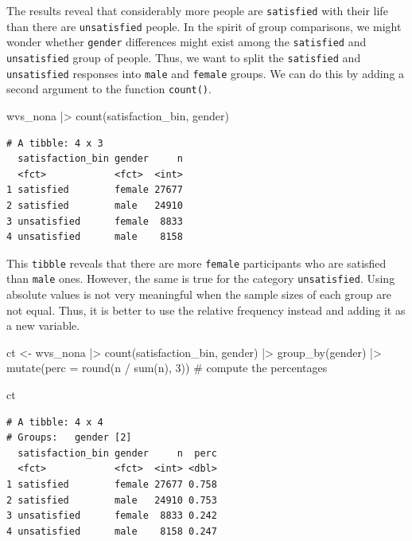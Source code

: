 \documentclass[
  letterpaper,
]{krantz}
\makeatletter
\newenvironment{Shaded}{\begin{snugshade}}{\end{snugshade}}
\newcommand{\AttributeTok}[1]{\textcolor[rgb]{0.40,0.45,0.13}{#1}}
\newcommand{\CommentTok}[1]{\textcolor[rgb]{0.37,0.37,0.37}{#1}}
\newcommand{\DecValTok}[1]{\textcolor[rgb]{0.68,0.00,0.00}{#1}}
\newcommand{\FunctionTok}[1]{\textcolor[rgb]{0.28,0.35,0.67}{#1}}
\newcommand{\NormalTok}[1]{\textcolor[rgb]{0.00,0.23,0.31}{#1}}
\newcommand{\OtherTok}[1]{\textcolor[rgb]{0.00,0.23,0.31}{#1}}
\newcommand{\SpecialCharTok}[1]{\textcolor[rgb]{0.37,0.37,0.37}{#1}}
\newenvironment{kframe}{%
\medskip{}
\setlength{\fboxsep}{.8em}
 \def\at@end@of@kframe{}%
 \ifinner\ifhmode%
  \def\at@end@of@kframe{\end{minipage}}%
  \begin{minipage}{\columnwidth}%
 \fi\fi%
 \def\FrameCommand##1{\hskip\@totalleftmargin \hskip-\fboxsep
 \colorbox{shadecolor}{##1}\hskip-\fboxsep
     \hskip-\linewidth \hskip-\@totalleftmargin \hskip\columnwidth}%
 \MakeFramed {\advance\hsize-\width
   \@totalleftmargin\z@ \linewidth\hsize
   \@setminipage}}%
 {\par\unskip\endMakeFramed%
 \at@end@of@kframe}
\renewenvironment{Shaded}{\begin{kframe}}{\end{kframe}}
\makeatother
\begin{document}
The results reveal that considerably more people are \texttt{satisfied}
with their life than there are \texttt{unsatisfied} people. In the
spirit of group comparisons, we might wonder whether \texttt{gender}
differences might exist among the \texttt{satisfied} and
\texttt{unsatisfied} group of people. Thus, we want to split the
\texttt{satisfied} and \texttt{unsatisfied} responses into \texttt{male}
and \texttt{female} groups. We can do this by adding a second argument
to the function \texttt{count()}.

\begin{Shaded}
\begin{Highlighting}[]
\NormalTok{wvs\_nona }\SpecialCharTok{|\textgreater{}} \FunctionTok{count}\NormalTok{(satisfaction\_bin, gender)}
\end{Highlighting}
\end{Shaded}

\begin{verbatim}
# A tibble: 4 x 3
  satisfaction_bin gender     n
  <fct>            <fct>  <int>
1 satisfied        female 27677
2 satisfied        male   24910
3 unsatisfied      female  8833
4 unsatisfied      male    8158
\end{verbatim}

This \texttt{tibble} reveals that there are more \texttt{female}
participants who are satisfied than \texttt{male} ones. However, the
same is true for the category \texttt{unsatisfied}. Using absolute
values is not very meaningful when the sample sizes of each group are
not equal. Thus, it is better to use the relative frequency instead and
adding it as a new variable.

\begin{Shaded}
\begin{Highlighting}[]
\NormalTok{ct }\OtherTok{\textless{}{-}}
\NormalTok{  wvs\_nona }\SpecialCharTok{|\textgreater{}}
  \FunctionTok{count}\NormalTok{(satisfaction\_bin, gender) }\SpecialCharTok{|\textgreater{}}
  \FunctionTok{group\_by}\NormalTok{(gender) }\SpecialCharTok{|\textgreater{}}
  \FunctionTok{mutate}\NormalTok{(}\AttributeTok{perc =} \FunctionTok{round}\NormalTok{(n }\SpecialCharTok{/} \FunctionTok{sum}\NormalTok{(n), }\DecValTok{3}\NormalTok{)) }\CommentTok{\# compute the percentages}

\NormalTok{ct}
\end{Highlighting}
\end{Shaded}

\begin{verbatim}
# A tibble: 4 x 4
# Groups:   gender [2]
  satisfaction_bin gender     n  perc
  <fct>            <fct>  <int> <dbl>
1 satisfied        female 27677 0.758
2 satisfied        male   24910 0.753
3 unsatisfied      female  8833 0.242
4 unsatisfied      male    8158 0.247
\end{verbatim}
\end{document}
